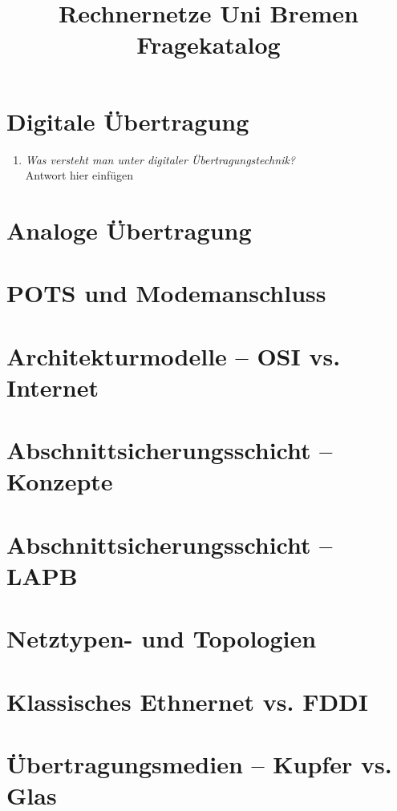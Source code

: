 \documentclass[hidelinks]{article}
\title{Rechnernetze Uni Bremen Fragekatalog}
\begin{document}
\maketitle
\section{Digitale Übertragung}
\begin{enumerate}
\item \textit{Was versteht man unter digitaler Übertragungstechnik?}\\
\-\hspace{.5cm}Antwort hier einfügen
\end{enumerate}
\section{Analoge Übertragung}

\section{POTS und Modemanschluss}

\section{Architekturmodelle -- OSI vs. Internet}

\section{Abschnittsicherungsschicht -- Konzepte}

\section{Abschnittsicherungsschicht -- LAPB}

\section{Netztypen- und Topologien}

\section{Klassisches Ethnernet vs. FDDI}

\section{Übertragungsmedien -- Kupfer vs. Glas}
\end{document}
